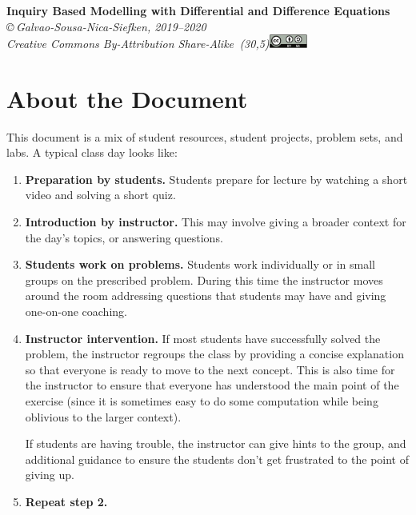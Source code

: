 \begin{center}
{\huge\bf Inquiry Based Modelling with Differential and Difference Equations}\\

\vspace{.7in}
{
\it \copyright\,Galvao-Sousa-Nica-Siefken, 2019--2020 \\
Creative Commons By-Attribution Share-Alike\, \makebox(30,5){\includegraphics[height=1.2em]{by-sa.pdf}}
}
\end{center}

\section*{About the Document}


This document is a mix of student resources, student projects, problem sets, and labs. 
A typical class day looks like:
\begin{enumerate}
	\item \textbf{Preparation by students.} Students prepare for lecture by watching a short video and solving a short quiz. 

	\item \textbf{Introduction by instructor.} This may involve giving a broader context for the day's topics, or answering questions.

	\item \textbf{Students work on problems.} Students work individually or in small groups
		on the prescribed problem. During this time the instructor moves
		around the room addressing questions that students may have and giving
		one-on-one coaching.

	\item \textbf{Instructor intervention.} If most students have successfully solved
		the problem, the instructor regroups the class by providing a concise
		explanation so that everyone is ready to move to the next concept.
		This is also time for the instructor to ensure that everyone has
		understood the main point of the exercise (since it is sometimes
		easy to do some computation while being oblivious to the larger context).

		If students are having trouble, the instructor can give hints to
		the group, and additional guidance to ensure the students don't get
		frustrated to the point of giving up.

	\item \textbf{Repeat step 2.}
\end{enumerate}

